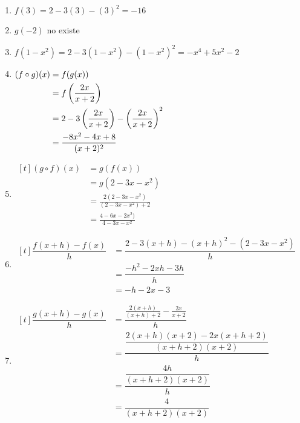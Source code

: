 \documentclass[10pt,respuestas,a4]{aleph-examen}
\begin{document}
\begin{preguntas}
\begin{respuesta}
    \hspace{0pt}
    \begin{enumerate}[label=\textit{\alph*)}]
    \item 
        $f(3) = 2 - 3(3) - (3)^2 = -16$
    \item
        $g(-2)$ no existe
    \item
        $f(1-x^2) = 2 - 3(1-x^2) - (1-x^2)^2 = -x^4 + 5 x^2 - 2$
    \item
        $\begin{aligned}[t]
        (f\circ g)(x) 
        & = f(g(x))\\
        & = f\left(\frac{2x}{x + 2}\right)\\
        & = 2 - 3\left(\frac{2x}{x + 2}\right) - \left(\frac{2x}{x + 2}\right)^2\\    
        & = \frac{-8 x^2 - 4x + 8}{(x + 2)^2}
        \end{aligned}$
    \item
        $\begin{aligned}[t]
        (g\circ f)(x) 
        & = g(f(x))\\
        & = g(2 - 3x - x^2)\\
        & = \frac{2(2 - 3x - x^2)}{(2 - 3x - x^2) + 2}\\
        & = \frac{4 - 6x - 2x^2)}{4 - 3x - x^2}
        \end{aligned}$
    \item
        $\begin{aligned}[t]
        \dfrac{f(x+h)-f(x)}{h}
        & = \dfrac{2 - 3(x+h) - (x+h)^2-(2 - 3x - x^2)}{h}\\
        & = \dfrac{-h^2 - 2 xh - 3h}{h}\\
        & = -h - 2 x - 3
        \end{aligned}$
    \item
        $\begin{aligned}[t]
        \dfrac{g(x+h)-g(x)}{h}
        & = \dfrac{\frac{2(x+h)}{(x+h) + 2}- \frac{2x}{x + 2}}{h}\\
        & = \dfrac{\dfrac{2(x+h)(x + 2)-2x(x+h + 2)}{(x+h + 2)(x + 2)}}{h}\\
        & = \dfrac{\dfrac{4h}{(x+h + 2)(x + 2)}}{h}\\
        & = \dfrac{4}{(x+h + 2)(x + 2)}
        \end{aligned}$
    \end{enumerate}    \qedhere
\end{respuesta}


\end{preguntas}
\end{document}
